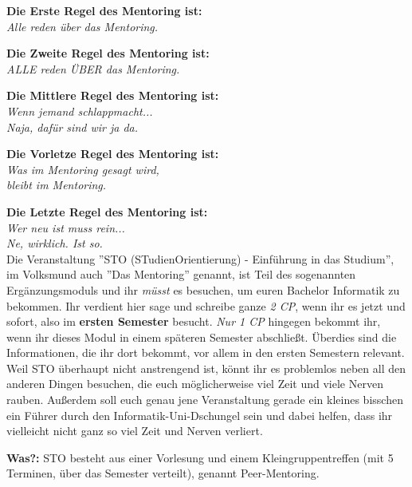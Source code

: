 \spaltenanfang
\textbf{Die Erste Regel des Mentoring ist:}\\ \textit{Alle reden über das Mentoring.}

\textbf{Die Zweite Regel des Mentoring ist:}\\ \textit{ALLE reden ÜBER das Mentoring.}

\textbf{Die Mittlere Regel des Mentoring ist:}\\ \textit{Wenn jemand schlappmacht...\\ Naja, dafür sind wir ja da.}

\textbf{Die Vorletze Regel des Mentoring ist:}\\ \textit{Was im Mentoring gesagt wird,\\ bleibt im Mentoring.}

\textbf{Die Letzte Regel des Mentoring ist:}\\ \textit{Wer neu ist muss rein...\\ Ne, wirklich. Ist so.}\\

Die Veranstaltung ''STO (STudienOrientierung) - Einführung in das Studium'', im Volksmund auch ''Das Mentoring'' genannt, ist Teil des sogenannten Ergänzungsmoduls und ihr \emph{müsst} es besuchen, um euren Bachelor Informatik zu bekommen. Ihr verdient hier sage und schreibe ganze \emph{2 CP}, wenn ihr es jetzt und sofort, also im \textbf{ersten Semester} besucht. \emph{Nur 1 CP} hingegen bekommt ihr, wenn ihr dieses Modul in einem späteren Semester abschließt. Überdies sind die Informationen, die ihr dort bekommt, vor allem in den ersten Semestern relevant. Weil STO überhaupt nicht anstrengend ist, könnt ihr es problemlos neben all den anderen Dingen besuchen, die euch möglicherweise viel Zeit und viele Nerven rauben. Außerdem soll euch genau jene Veranstaltung gerade ein kleines bisschen ein Führer durch den Informatik-Uni-Dschungel sein und dabei helfen, dass ihr vielleicht nicht ganz so viel Zeit und Nerven verliert.

\textbf{Was?:} STO besteht aus einer Vorlesung und einem Kleingruppentreffen (mit 5 Terminen, über das Semester verteilt), genannt Peer-Mentoring.

